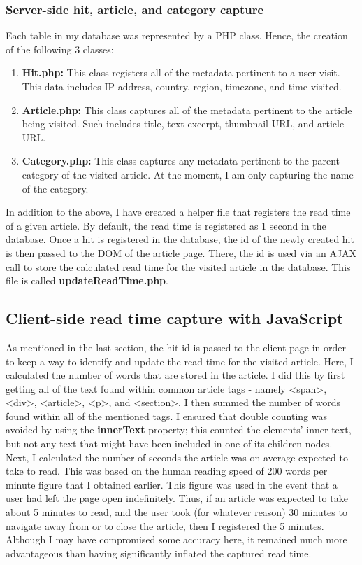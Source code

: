 \documentclass[12pt]{article}
\begin{document}
\subsubsection{Server-side hit, article, and category capture}
Each table in my database was represented by a PHP class. Hence, the creation of the following 3 classes:
\begin{enumerate}
\item{\textbf{Hit.php:}} This class registers all of the metadata pertinent to a user visit. This data includes IP address, country, region, timezone, and time visited. 
\item{\textbf{Article.php:}} This class captures all of the metadata pertinent to the article being visited. Such includes title, text excerpt, thumbnail URL, and article URL.
\item{\textbf{Category.php:}} This class captures any metadata pertinent to the parent category of the visited article. At the moment, I am only capturing the name of the category.
\end{enumerate}

In addition to the above, I have created a helper file that registers the read time of a given article. By default, the read time is registered as 1 second in the database. Once a hit is registered in the database, the id of the newly created hit is then passed to the DOM of the article page. There, the id is used via an AJAX call to store the calculated read time for the visited article in the database. This file is called \textbf{updateReadTime.php}.
\vfill

\subsection{Client-side read time capture with JavaScript}
As mentioned in the last section, the hit id is passed to the client page in order to keep a way to identify and update the read time for the visited article. Here, I calculated the number of words that are stored in the article. I did this by first getting all of the text found within common article tags - namely <span>, <div>, <article>, <p>, and <section>. I then summed the number of words found within all of the mentioned tags. I ensured that double counting was avoided by using the \textbf{innerText} property; this counted the elements' inner text, but not any text that might have been included in one of its children nodes. Next, I calculated the number of seconds the article was on average expected to take to read. This was based on the human reading speed of 200 words per minute figure that I obtained earlier. This figure was used in the event that a user had left the page open indefinitely. Thus, if an article was expected to take about 5 minutes to read, and the user took (for whatever reason) 30 minutes to navigate away from or to close the article, then I registered the 5 minutes. Although I may have compromised some accuracy here, it remained much more advantageous than having significantly inflated the captured read time.
\end{document}
